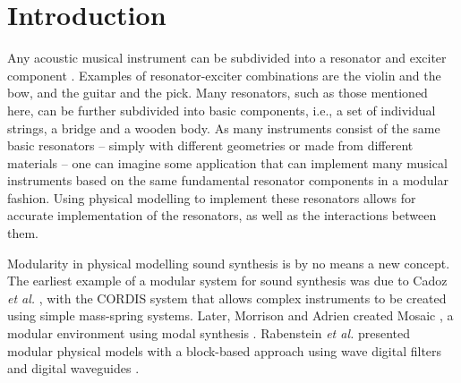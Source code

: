 \documentclass{article}
\title{\papertitle}
\begin{document}
%
\capstartfalse
\maketitle
\capstarttrue
%
\begin{abstract}
Through recent advances in processing power, physical modelling using finite-difference time-domain (FDTD) methods has gained popularity. Many different musical instrument models based on these methods exist, and nearly all are based on the same underlying systems and interactions between them. This paper presents an application where individual resonator modules, such as strings, bars, membranes and plates, can be connected in a modular fashion and interacted with in real time. Various excitations, including the bow, hammer and pluck, are implemented as well, allowing for expressive control and a wide sonic palette. Existing and non-existing model configurations can easily be implemented, modified and experimented with, as well as the parameters describing them.
\end{abstract}
%

\section{Introduction}\label{sec:introduction}
Any acoustic musical instrument can be subdivided into a resonator and exciter component \cite{Borin1989}. Examples of resonator-exciter combinations are the violin and the bow, and the guitar and the pick. Many resonators, such as those mentioned here, can be further subdivided into basic components, i.e., a set of individual strings, a bridge and a wooden body. As many instruments consist of the same basic resonators -- simply with different geometries or made from different materials -- one can imagine some application that can implement many musical instruments based on the same fundamental resonator components in a modular fashion. Using physical modelling to implement these resonators allows for accurate implementation of the resonators, as well as the interactions between them.  

Modularity in physical modelling sound synthesis is by no means a new concept. The earliest example of a modular system for sound synthesis was due to Cadoz \textit{et al.} \cite{Cadoz1983}, with the CORDIS system that allows complex instruments to be created using simple mass-spring systems. Later, Morrison and Adrien created Mosaic \cite{Morrison1993}, a modular environment using modal synthesis \cite{Adrien1991}. Rabenstein \textit{et al.} presented modular physical models with a block-based approach using wave digital filters \cite{Rabenstein2007} and digital waveguides \cite{Smith1992}. 
\end{document}
